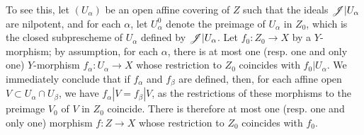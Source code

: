 \begin{remark}[17.1.2]
\begin{enumerate}
		To see this, let $(U_\alpha)$ be an open affine covering of $Z$ such that the ideals $\mathscr{J}|U_\alpha$ are nilpotent, and for each $\alpha$, let $U_\alpha ^0$ denote the preimage of $U_\alpha$ in $Z_0$, which is the closed subprescheme of $U_\alpha$ defined by $\mathscr{J}|U_\alpha$. Let $f_0: Z_0 \to X$ by a $Y$-morphism; by assumption, for each $\alpha$, there is at most one (resp. one and only one) $Y$-morphism $f_\alpha: U_\alpha \to X$ whose restriction to $Z_0$ coincides with $f_0|U_\alpha$. We immediately conclude that if $f_\alpha$ and $f_\beta$ are defined, then, for each affine open $V \subset U_\alpha \cap U_\beta$, we have $f_\alpha|V = f_\beta|V$, as the restrictions of these morphisms to the preimage $V_0$ of $V$ in $Z_0$ coincide. There is therefore at most one (resp. one and only one) morphism $f : Z \to X$ whose restriction to $Z_0$ coincides with $f_0$.
\end{enumerate}
\end{remark}

